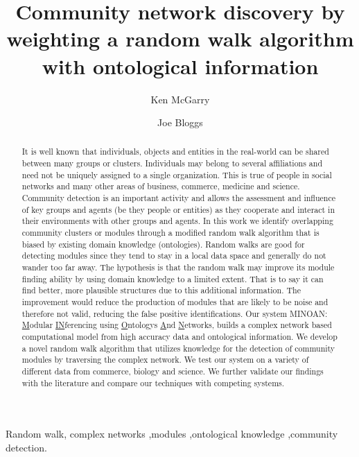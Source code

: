 \documentclass[a4paper,8pt,twocolumn,5p]{elsarticle}
\begin{document}
\begin{frontmatter}
\title{Community network discovery by weighting a random walk algorithm with ontological information}

\author[add2]{Ken McGarry}
\author[add2]{Joe Bloggs}
\address[add2]{School of Computing, Faculty of Technology, \\University of Sunderland, St Peters Campus, 
\\Sunderland, SR6 ODD, UK}

\begin{abstract}
It is well known that individuals, objects and entities in the real-world can be shared between many groups or clusters. Individuals may belong to several affiliations and need not be uniquely assigned to a single organization. This is true of people in social networks and many other areas of business, commerce, medicine and science. Community detection is an important activity and allows the assessment and influence of key groups and agents (be they people or entities) as they cooperate and interact in their environments with other groups and agents. In this work we  identify overlapping community clusters or modules through a modified random walk algorithm that is biased by existing domain knowledge (ontologies). Random walks are good for detecting modules since they tend to stay in a local data space and generally do not wander too far away. The hypothesis is that the random walk may improve its module finding ability by using domain knowledge to a limited extent. That is to say it can find better, more plausible structures due to this additional information. The improvement would reduce the production of modules that are likely to be noise and therefore not valid, reducing the false positive identifications. Our system MINOAN: \underline{M}odular \underline{IN}ferencing using \underline{O}ntologys \underline{A}nd \underline{N}etworks, builds a complex network based computational model from high accuracy data and ontological information. We develop a novel random walk algorithm that utilizes knowledge  for the detection of community modules by traversing the complex network. We test our system on a variety of different data from commerce, biology and science. We further validate our findings with the literature and compare our techniques with competing systems. 
\end{abstract}

\begin{keyword}
Random walk, complex networks \sep modules \sep ontological knowledge \sep community detection.
\end{keyword}
\end{frontmatter}
\end{document}
